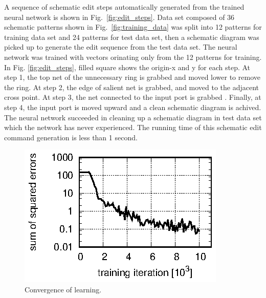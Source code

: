 \documentclass[twocolumn]{article}
\begin{document}
A sequence of schematic edit steps automatically generated
from the trained neural network is shown in Fig.\ \ref{fig:edit_steps}.
Data set composed of 36 schematic patterns
shown in Fig.\ \ref{fig:training_data}
was split into 12 patterns for training data set
and 24 patterns for test data set,
then a schematic diagram was picked up to generate the edit sequence
from the test data set.
The neural network was trained with vectors
orinating only from the 12 patterns for training.
In Fig. \ref{fig:edit_steps}, filled square shows the origin-x and y
for each step.
At step 1, the top net of the unnecessary ring is grabbed and moved lower
to remove the ring.
At step 2, the edge of salient net is grabbed,
and moved to the adjacent cross point.
At step 3, the net connected to the input port is grabbed .
Finally, at step 4, the input port is moved upward
and a clean schematic diagram is achived.
The neural network succeeded in cleaning up a schematic diagram
in test data set
which the network has never experienced.
The running time of this schematic edit command generation
is less than 1 second.

\begin{figure}[!tp]
 \begin{center}
  \begin{minipage}{\hsize}
   \includegraphics[width=\hsize]{fig/errors.eps}
   \caption{Convergence of learning.}
   \label{fig:errors}
  \end{minipage}
 \end{center}
\end{figure}
\end{document}
